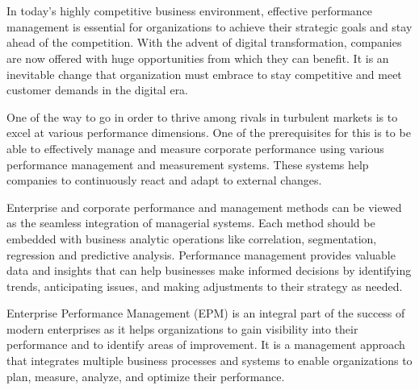 \documentclass[12pt,a4paper,openright,twoside]{book}
\begin{document}
\tableofcontents   

\mainmatter

\chapter{\introductionname}
\label{chap:introduction}

In today's highly competitive business environment, effective performance management is essential for organizations to achieve their strategic goals and stay ahead of the competition.
%
With the advent of digital transformation, companies are now offered with huge opportunities from which they can benefit.
%
It is an inevitable change that organization must embrace to stay competitive and meet customer demands in the digital era.

One of the way to go in order to thrive among rivals in turbulent markets is to excel at various performance dimensions. 
%
One of the prerequisites for this is to be able to effectively manage and measure corporate performance using various performance management and measurement systems. 
%
These systems help companies to continuously react and adapt to external changes.

Enterprise and corporate performance and management methods can be viewed as the seamless integration of managerial systems. 
%
Each method should be embedded with business analytic operations like correlation, segmentation, regression and predictive analysis.
%
Performance management provides valuable data and insights that can help businesses make informed decisions by identifying trends, anticipating issues, and making adjustments to their strategy as needed.

Enterprise Performance Management (EPM) is an integral part of the success of modern enterprises as it helps organizations to gain visibility into their performance and to identify areas of improvement.
%
It is a management approach that integrates multiple business processes and systems to enable organizations to plan, measure, analyze, and optimize their performance.
\end{document}
